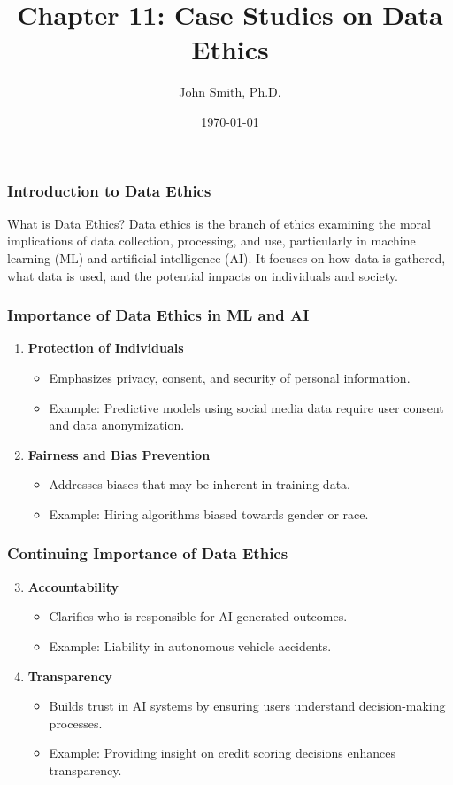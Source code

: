 \documentclass[aspectratio=169]{beamer}
\title[Data Ethics Case Studies]{Chapter 11: Case Studies on Data Ethics}
\author[J. Smith]{John Smith, Ph.D.}
\institute[University Name]{
  Department of Computer Science\\
  University Name\\
  \vspace{0.3cm}
  Email: email@university.edu\\
  Website: www.university.edu
}
\date{\today}
\begin{document}
\frame{\titlepage}

\begin{frame}[fragile]
    \frametitle{Introduction to Data Ethics}
    \begin{block}{What is Data Ethics?}
        Data ethics is the branch of ethics examining the moral implications of data collection, processing, and use, particularly in machine learning (ML) and artificial intelligence (AI). 
        It focuses on how data is gathered, what data is used, and the potential impacts on individuals and society.
    \end{block}
\end{frame}

\begin{frame}[fragile]
    \frametitle{Importance of Data Ethics in ML and AI}
    \begin{enumerate}
        \item \textbf{Protection of Individuals} 
        \begin{itemize}
            \item Emphasizes privacy, consent, and security of personal information.
            \item Example: Predictive models using social media data require user consent and data anonymization.
        \end{itemize}

        \item \textbf{Fairness and Bias Prevention} 
        \begin{itemize}
            \item Addresses biases that may be inherent in training data.
            \item Example: Hiring algorithms biased towards gender or race.
        \end{itemize}
    \end{enumerate}
\end{frame}

\begin{frame}[fragile]
    \frametitle{Continuing Importance of Data Ethics}
    \begin{enumerate}
        \setcounter{enumi}{2}
        \item \textbf{Accountability} 
        \begin{itemize}
            \item Clarifies who is responsible for AI-generated outcomes.
            \item Example: Liability in autonomous vehicle accidents.
        \end{itemize}

        \item \textbf{Transparency} 
        \begin{itemize}
            \item Builds trust in AI systems by ensuring users understand decision-making processes.
            \item Example: Providing insight on credit scoring decisions enhances transparency.
        \end{itemize}
    \end{enumerate}
\end{frame}
\end{document}
